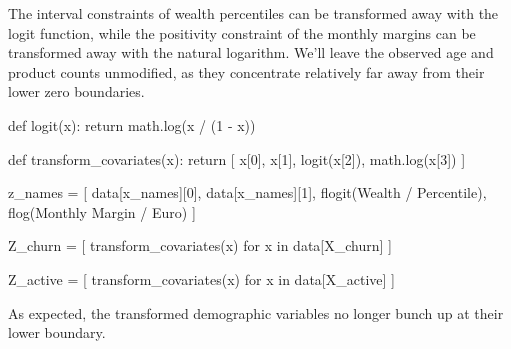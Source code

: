 \documentclass[
  letterpaper,
  DIV=11,
  numbers=noendperiod]{scrartcl}
\newenvironment{Shaded}{\begin{snugshade}}{\end{snugshade}}
\newcommand{\ControlFlowTok}[1]{\textcolor[rgb]{0.00,0.23,0.31}{#1}}
\newcommand{\DecValTok}[1]{\textcolor[rgb]{0.68,0.00,0.00}{#1}}
\newcommand{\KeywordTok}[1]{\textcolor[rgb]{0.00,0.23,0.31}{#1}}
\newcommand{\NormalTok}[1]{\textcolor[rgb]{0.00,0.23,0.31}{#1}}
\newcommand{\OperatorTok}[1]{\textcolor[rgb]{0.37,0.37,0.37}{#1}}
\newcommand{\SpecialStringTok}[1]{\textcolor[rgb]{0.13,0.47,0.30}{#1}}
\newcommand{\StringTok}[1]{\textcolor[rgb]{0.13,0.47,0.30}{#1}}
\begin{document}
The interval constraints of wealth percentiles can be transformed away
with the logit function, while the positivity constraint of the monthly
margins can be transformed away with the natural logarithm. We'll leave
the observed age and product counts unmodified, as they concentrate
relatively far away from their lower zero boundaries.

\begin{Shaded}
\begin{Highlighting}[]
\KeywordTok{def}\NormalTok{ logit(x):}
  \ControlFlowTok{return}\NormalTok{ math.log(x }\OperatorTok{/}\NormalTok{ (}\DecValTok{1} \OperatorTok{{-}}\NormalTok{ x))}

\KeywordTok{def}\NormalTok{ transform\_covariates(x):}
  \ControlFlowTok{return}\NormalTok{ [ x[}\DecValTok{0}\NormalTok{], x[}\DecValTok{1}\NormalTok{], logit(x[}\DecValTok{2}\NormalTok{]), math.log(x[}\DecValTok{3}\NormalTok{]) ]}

\NormalTok{z\_names }\OperatorTok{=}\NormalTok{ [ data[}\StringTok{\textquotesingle{}x\_names\textquotesingle{}}\NormalTok{][}\DecValTok{0}\NormalTok{],}
\NormalTok{            data[}\StringTok{\textquotesingle{}x\_names\textquotesingle{}}\NormalTok{][}\DecValTok{1}\NormalTok{],}
            \SpecialStringTok{f\textquotesingle{}logit(Wealth / Percentile)\textquotesingle{}}\NormalTok{,}
            \SpecialStringTok{f\textquotesingle{}log(Monthly Margin / Euro)\textquotesingle{}}\NormalTok{    ]}
\end{Highlighting}
\end{Shaded}

\begin{Shaded}
\begin{Highlighting}[]
\NormalTok{Z\_churn }\OperatorTok{=}\NormalTok{ [ transform\_covariates(x)}
            \ControlFlowTok{for}\NormalTok{ x }\KeywordTok{in}\NormalTok{ data[}\StringTok{\textquotesingle{}X\_churn\textquotesingle{}}\NormalTok{] ]}

\NormalTok{Z\_active }\OperatorTok{=}\NormalTok{ [ transform\_covariates(x)}
            \ControlFlowTok{for}\NormalTok{ x }\KeywordTok{in}\NormalTok{ data[}\StringTok{\textquotesingle{}X\_active\textquotesingle{}}\NormalTok{] ]}
\end{Highlighting}
\end{Shaded}

As expected, the transformed demographic variables no longer bunch up at
their lower boundary.
\end{document}
